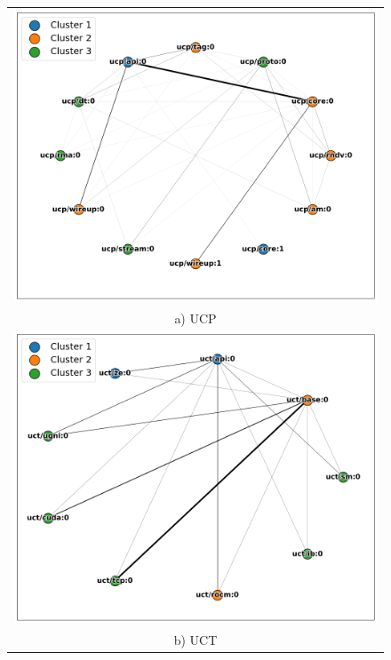 \begin{figure}[Ht]
    \centering
    \begin{tabular}{c}
        \includegraphics[width=0.96\linewidth]{figures/ucx_analysis/ucp.png} \\
        a) UCP \\
        \includegraphics[width=0.96\linewidth]{figures/ucx_analysis/uct.png} \\
        b) UCT \\

\end{tabular}
\end{figure}
